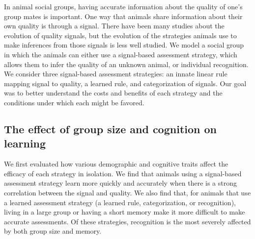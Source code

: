 In animal social groups, having accurate information about the quality of one's group mates is important. One way that animals share information about their own quality is through a signal. There have been many studies about the evolution of quality signals, but the evolution of the strategies animals use to make inferences from those signals is less well studied. We model a social group in which the animals can either use a signal-based assessment strategy, which allows them to infer the quality of an unknown animal, or individual recognition. We consider three signal-based assessment strategies: an innate linear rule mapping signal to quality, a learned rule, and categorization of signals. Our goal was to better understand the costs and benefits of each strategy and the conditions under which each might be favored. 


\subsection*{The effect of group size and cognition on learning} 
We first evaluated how various demographic and cognitive traits affect the efficacy of each strategy in isolation. We  find that animals using a signal-based assessment strategy learn more quickly and accurately when there is a strong correlation between the signal and quality. We also find that, for animals that use a learned assessment strategy (a learned rule, categorization, or recognition), living in a large group or having a short memory make it more difficult to make accurate assessments. Of these strategies, recognition is the most severely affected by both group size and memory.  

